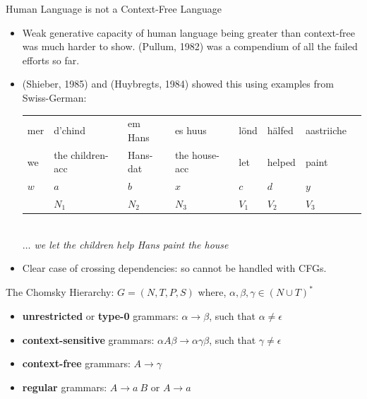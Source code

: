 \documentclass[landscape]{slides}
\begin{document}
\begin{slide}{Human Language is not a Context-Free Language}
\begin{itemize}
\item Weak generative capacity of human language being greater than
context-free was much harder to show. (Pullum, 1982) was a compendium
of all the failed efforts so far.
\item  (Shieber, 1985) and (Huybregts, 1984) showed this using examples from Swiss-German:\\
\begin{tabular}{llllllll}
mer & d'chind & em Hans & es  huus & l\"ond & h\"alfed & aastriiche \\
we & the children-{\sc acc} & Hans-{\sc dat} & the  house-{\sc acc} & let & helped & paint \\
$w$ & $a$ & $b$ & $x$ & $c$ & $d$ & $y$ \\
& $N_1$ & $N_2$  & $N_3$ &  $V_1$ & $V_2$ & $V_3$
\end{tabular}\\
{\em $\ldots$ we let the children help Hans paint the house}
\item Clear case of crossing dependencies: so cannot be handled with CFGs.
\end{itemize}
\end{slide}


\begin{slide}{The Chomsky Hierarchy: $G = (N,T,P,S)$ where, $\alpha, \beta,
    \gamma \in (N \cup T)^\ast$}
\begin{itemize}
\item {\bf unrestricted} or {\bf type-0} grammars: $\alpha \rightarrow
\beta$, such that $\alpha \neq \epsilon$
\item {\bf context-sensitive} grammars: $\alpha A \beta \rightarrow
\alpha \gamma \beta$, such that $\gamma \neq \epsilon$
\item {\bf context-free} grammars: $A \rightarrow \gamma$
\item {\bf regular} grammars: $A \rightarrow a\ B$ or $A \rightarrow
a$
\end{itemize}
\end{slide}
\end{document}
